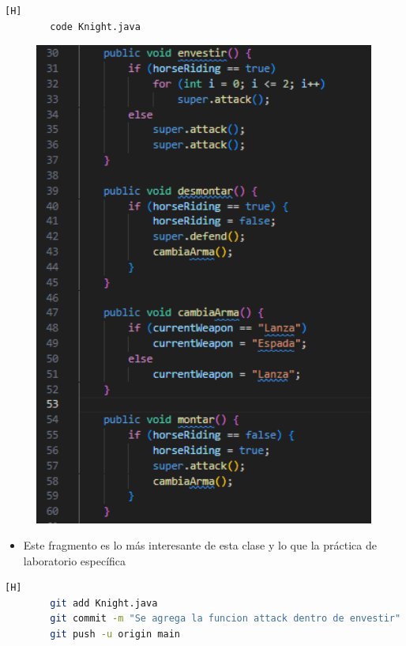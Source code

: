 \documentclass{article}
\begin{document}
	\begin{lstlisting}[language=bash,caption={Se crea la subclase Knight }][H]
		code Knight.java
	\end{lstlisting}
	\begin{figure}[H]
		\centering
		\includegraphics[width=1\textwidth,keepaspectratio]{img/knight.png}
	\end{figure}
	\begin{itemize}	
		\item Este fragmento es lo más interesante de esta clase y lo que la práctica de laboratorio específica  
	\end{itemize}	
	\begin{lstlisting}[language=bash,caption={Commit: a4b277fea2814d4543b4b906fc545da59c009198 }][H]
		git add Knight.java
		git commit -m "Se agrega la funcion attack dentro de envestir"			
		git push -u origin main
	\end{lstlisting}
	
\end{document}

